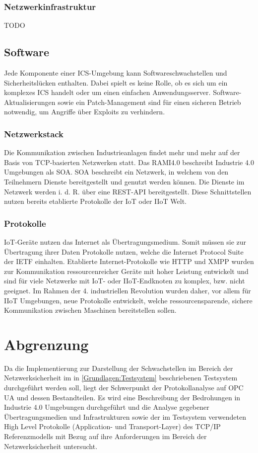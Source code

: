 \subsubsection{Netzwerkinfrastruktur}
TODO

\subsection{Software}
Jede Komponente einer \ac{ICS}-Umgebung kann Softwareschwachstellen und Sicherheitslücken enthalten. Dabei spielt es keine Rolle, ob es sich um ein komplexes \ac{ICS} handelt oder um einen einfachen Anwendungsserver. Software-Aktualisierungen sowie ein Patch-Management sind für einen sicheren Betrieb notwendig, um Angriffe über Exploits zu verhindern.

\subsubsection{Netzwerkstack}
Die Kommunikation zwischen Industrieanlagen findet mehr und mehr auf der Basis von TCP-basierten Netzwerken statt. Das \ac{RAMI4.0} beschreibt Industrie 4.0 Umgebungen als \ac{SOA}. \ac{SOA} beschreibt ein Netzwerk, in welchem von den Teilnehmern Dienste bereitgestellt und genutzt werden können. Die Dienste im Netzwerk werden i. d. R. über eine \ac{REST}-\ac{API} bereitgestellt. Diese Schnittstellen nutzen bereits etablierte Protokolle der \ac{IoT} oder \ac{IIoT} Welt.

\subsubsection{Protokolle}
\ac{IoT}-Geräte nutzen das Internet als Übertragungsmedium. Somit müssen sie zur Übertragung ihrer Daten Protokolle nutzen, welche die Internet Protocol Suite der \ac{IETF} einhalten. Etablierte Internet-Protokolle wie HTTP und XMPP wurden zur Kommunikation ressourcenreicher Geräte mit hoher Leistung entwickelt und sind für viele Netzwerke mit \ac{IoT}- oder \ac{IIoT}-Endknoten zu komplex, bzw. nicht geeignet. Im Rahmen der 4. industriellen Revolution wurden daher, vor allem für \ac{IIoT} Umgebungen, neue Protokolle entwickelt, welche ressourcensparende, sichere Kommunikation zwischen Maschinen bereitstellen sollen. 

\section{Abgrenzung}
Da die Implementierung zur Darstellung der Schwachstellen im Bereich der Netzwerksicherheit im in \autoref{Grundlagen:Testsystem} beschriebenen Testsystem durchgeführt werden soll, liegt der Schwerpunkt der Protokollanalyse auf \ac{OPC UA} und dessen Bestandteilen. Es wird eine Beschreibung der Bedrohungen in Industrie 4.0 Umgebungen durchgeführt und die Analyse gegebener Übertragungsmedien und Infrastrukturen sowie der im Testsystem verwendeten High Level Protokolle (Application- und Transport-Layer) des TCP/IP Referenzmodells mit Bezug auf ihre Anforderungen im Bereich der Netzwerksicherheit untersucht.

